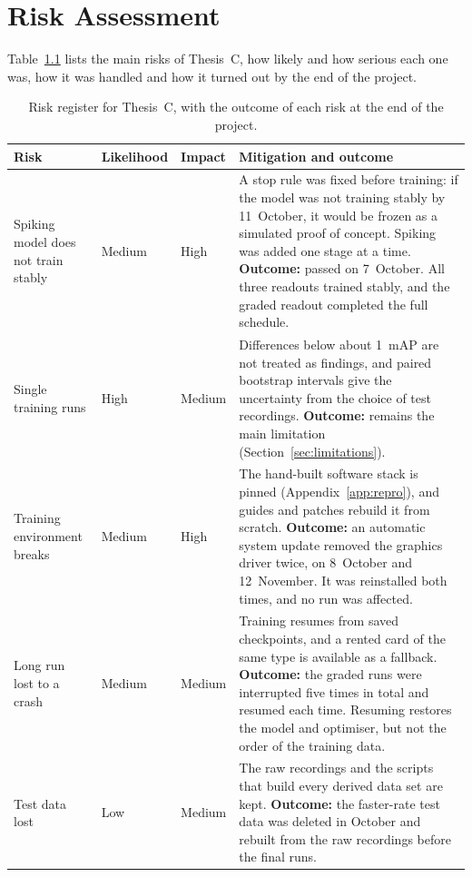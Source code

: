 \documentclass[11pt, a4paper]{report}
\begin{document}
\chapter{Risk Assessment}
\label{app:risk}
Table~\ref{tab:risk_assessment} lists the main risks of Thesis~C, how likely and how serious each one was, how
it was handled and how it turned out by the end of the project.

\begin{table}[htbp]
    \centering
    \small
    \caption[Risk assessment]{Risk register for Thesis~C, with the outcome of each risk at the end of the project.}
    \label{tab:risk_assessment}
    \renewcommand{\arraystretch}{1.4}
    \begin{tabularx}{\textwidth}{|>{\RaggedRight\arraybackslash}p{3.2cm}|l|l|>{\RaggedRight\arraybackslash}X|}
        \hline
        \rowcolor[gray]{0.9} \textbf{Risk} & \textbf{Likelihood} & \textbf{Impact} & \textbf{Mitigation and outcome} \\ \hline
        Spiking model does not train stably & Medium & High & A stop rule was fixed before training: if the model was not training stably by 11~October, it would be frozen as a simulated proof of concept. Spiking was added one stage at a time. \textbf{Outcome:} passed on 7~October. All three readouts trained stably, and the graded readout completed the full schedule. \\ \hline
        Single training runs & High & Medium & Differences below about 1~mAP are not treated as findings, and paired bootstrap intervals give the uncertainty from the choice of test recordings. \textbf{Outcome:} remains the main limitation (Section~\ref{sec:limitations}). \\ \hline
        Training environment breaks & Medium & High & The hand-built software stack is pinned (Appendix~\ref{app:repro}), and guides and patches rebuild it from scratch. \textbf{Outcome:} an automatic system update removed the graphics driver twice, on 8~October and 12~November. It was reinstalled both times, and no run was affected. \\ \hline
        Long run lost to a crash & Medium & Medium & Training resumes from saved checkpoints, and a rented card of the same type is available as a fallback. \textbf{Outcome:} the graded runs were interrupted five times in total and resumed each time. Resuming restores the model and optimiser, but not the order of the training data. \\ \hline
        Test data lost & Low & Medium & The raw recordings and the scripts that build every derived data set are kept. \textbf{Outcome:} the faster-rate test data was deleted in October and rebuilt from the raw recordings before the final runs. \\ \hline

\end{tabularx}
\end{table}
\end{document}
